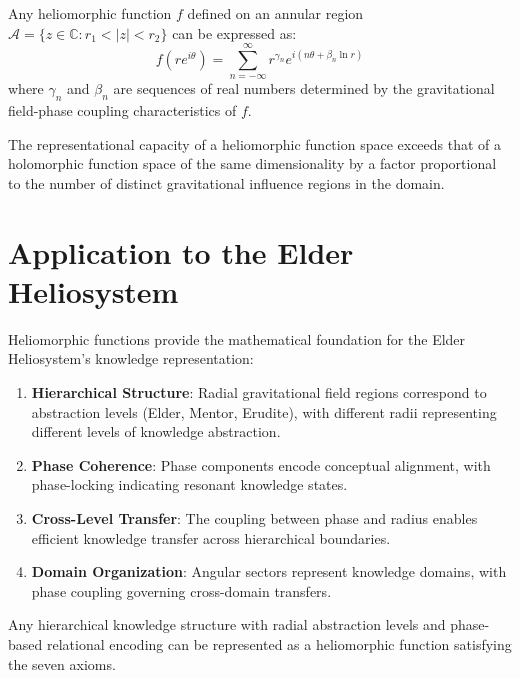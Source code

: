 \begin{theorem}
Any heliomorphic function $f$ defined on an annular region $\mathcal{A} = \{z \in \mathbb{C} : r_1 < |z| < r_2\}$ can be expressed as:
\begin{equation}
f(re^{i\theta}) = \sum_{n=-\infty}^{\infty} r^{\gamma_n} e^{i(n\theta + \beta_n \ln r)}
\end{equation}
where $\gamma_n$ and $\beta_n$ are sequences of real numbers determined by the gravitational field-phase coupling characteristics of $f$.
\end{theorem}

\begin{theorem}
The representational capacity of a heliomorphic function space exceeds that of a holomorphic function space of the same dimensionality by a factor proportional to the number of distinct gravitational influence regions in the domain.
\end{theorem}

\section{Application to the Elder Heliosystem}

Heliomorphic functions provide the mathematical foundation for the Elder Heliosystem's knowledge representation:

\begin{enumerate}
    \item \textbf{Hierarchical Structure}: Radial gravitational field regions correspond to abstraction levels (Elder, Mentor, Erudite), with different radii representing different levels of knowledge abstraction.
    
    \item \textbf{Phase Coherence}: Phase components encode conceptual alignment, with phase-locking indicating resonant knowledge states.
    
    \item \textbf{Cross-Level Transfer}: The coupling between phase and radius enables efficient knowledge transfer across hierarchical boundaries.
    
    \item \textbf{Domain Organization}: Angular sectors represent knowledge domains, with phase coupling governing cross-domain transfers.
\end{enumerate}

\begin{theorem}
Any hierarchical knowledge structure with radial abstraction levels and phase-based relational encoding can be represented as a heliomorphic function satisfying the seven axioms.
\end{theorem}

